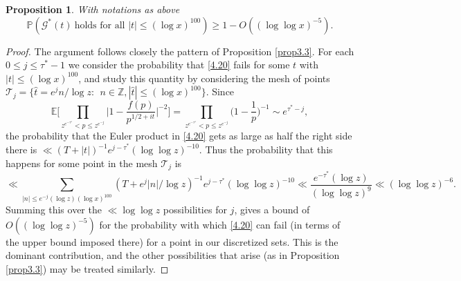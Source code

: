 \documentclass[12pt, notitlepage]{amsart}
\numberwithin{equation}{section}
\def\P{\mathbb P}
\def\E{\mathbb E}
\newtheorem{proposition}[theorem]{Proposition}
\theoremstyle{remark}
\theoremstyle{definition}
\theoremstyle{remark}
\numberwithin{equation}{section}
\begin{document}
\begin{proposition} \label{prop4.6}  With notations as above 
$$  
\P\left( \mathcal{G}^{*}(t)~\text{holds for all $|t|\le (\log x)^{100}$} \right) \geq 1 - O((\log\log x)^{-5}). 
$$ 
 \end{proposition}
\begin{proof}  The argument follows closely the pattern of Proposition \ref{prop3.3}.   For each $0\le j\le \tau^*-1$ we consider the probability that \eqref{4.20} fails for some $t$ with $|t|\le (\log x)^{100}$, and study this quantity by considering the mesh of points ${\mathcal T}_j = \{ {\hat t} = e^{j}n/\log z: \ \ n\in {\mathbb Z}, |{\hat t}|\le (\log x)^{100}\}$.  Since 
$$ 
\E\Big[ \prod_{z^{e^{-\tau^*}} <p \le z^{e^{-j}} } \Big|1-\frac{f(p)}{p^{1/2+ it}}\Big|^{-2}\Big] = \prod_{z^{e^{-\tau^*}} <p \le z^{e^{-j}} } \Big(1-\frac 1p\Big)^{-1} \sim e^{\tau^* -j}, 
$$ 
the probability that the Euler product in \eqref{4.20} gets as large as half the right side there is $\ll (T+|t|)^{-1} e^{j-\tau^*} (\log \log z)^{-10}$.  Thus the probability that this happens for some point in the mesh ${\mathcal T}_j$ is 
$$ 
\ll \sum_{|n|\le e^{-j} (\log z)(\log x)^{100}} (T+ e^{j}|n|/\log z)^{-1} e^{j-\tau^*} (\log \log z)^{-10} \ll \frac{e^{-\tau^*} (\log z)}{(\log \log z)^9} \ll (\log \log z)^{-6}. 
$$ 
Summing this over the $\ll \log \log z$ possibilities for $j$, gives a bound of $O( (\log \log z)^{-5})$ for the probability with which \eqref{4.20} can fail (in terms of the upper bound imposed there) for a point in our discretized sets.  This is the dominant contribution, and the other possibilities that arise (as in Proposition \ref{prop3.3}) may be treated similarly. 
\end{proof} 
\end{document}
